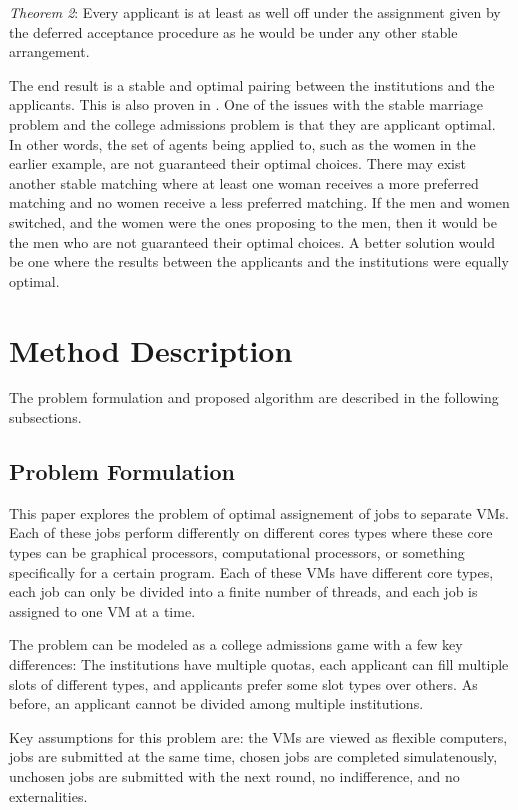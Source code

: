 \documentclass[conference]{IEEEtran}
\begin{document}
\emph{Theorem 2}:  Every applicant is at least as well off under the assignment
given by the deferred acceptance procedure as he would be under any other
stable arrangement.

The end result is a stable and optimal pairing between
the institutions and the applicants.  This is also proven in \cite{gale_college_1962}.  One 
of the issues with the stable marriage problem and the college admissions problem
is that they are applicant optimal.  In other words, the set of agents being
applied to, such as the women in the earlier example, are not guaranteed
their optimal choices. 
There may exist another stable matching where at least one woman
receives a more preferred matching and no women receive a less preferred matching.
If the men and women switched, and the
women were the ones proposing to the men, then it would be the men who are 
not guaranteed their optimal choices. A better solution
would be one where the results between the applicants
and the institutions were equally optimal.

\section{Method Description}
\label{sec:method}
The problem formulation and proposed algorithm
are described in the following subsections.

\subsection{Problem Formulation}
This paper explores the problem of optimal assignement
of jobs to separate VMs.  Each of these
jobs perform differently on different cores types where these
core types can be graphical processors, computational
processors, or something specifically for a certain program.  
Each of these VMs
have different core types, each job can only be divided into
a finite number of threads, and each job is assigned to 
one VM at a time.

The problem can be modeled as a college admissions
game with a few key differences:
The institutions
have multiple quotas, each applicant can fill multiple
slots of different types, and applicants prefer some
slot types over others.
As before, an applicant cannot be
divided among multiple institutions.

Key assumptions for this problem are:  the VMs
are viewed as flexible computers, jobs are submitted at
the same time, chosen jobs are completed simulatenously,
unchosen jobs are submitted with the next round, no
indifference, and no externalities.
\end{document}
